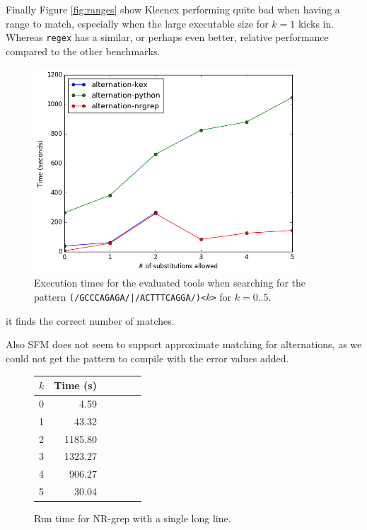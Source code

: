 Finally Figure \ref{fig:ranges} show Kleenex performing quite bad when having a
range to match, especially when the large executable size for $k=1$ kicks in.
Whereas \texttt{regex} has a similar, or perhaps even better, relative
performance compared to the other benchmarks.

\begin{figure}[H]
  \centering
  \includegraphics[width=0.88\textwidth]{images/alternation.png}
  \caption{Execution times for the evaluated tools when searching for the
    pattern \texttt{(/GCCCAGAGA/|/ACTTTCAGGA/)<$k$>} for $k=0..5$.}
  \label{fig:alternation}
\end{figure}

it finds the correct number of matches.

Also SFM does not seem to support approximate matching for alternations, as we
could not get the pattern to compile with the error values added.

\begin{figure}[H]
    \centering
    \begin{tabular}{l|rrrrr}
        $k$ & Time (s)\\\hline
        0   & 4.59\\
        1   & 43.32\\
        2   & 1185.80\\
        3   & 1323.27\\
        4   & 906.27\\
        5   & 30.04\\
    \end{tabular}
    \caption{Run time for NR-grep with a single long line.}
    \label{fig:nr-longline}
\end{figure}


